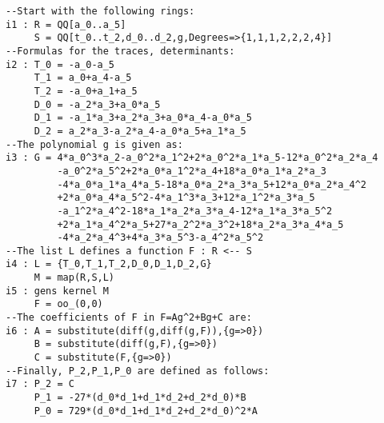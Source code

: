 %
\begin{small} 
\begin{verbatim}
--Start with the following rings:
i1 : R = QQ[a_0..a_5]
     S = QQ[t_0..t_2,d_0..d_2,g,Degrees=>{1,1,1,2,2,2,4}]
--Formulas for the traces, determinants:
i2 : T_0 = -a_0-a_5
     T_1 = a_0+a_4-a_5
     T_2 = -a_0+a_1+a_5
     D_0 = -a_2*a_3+a_0*a_5
     D_1 = -a_1*a_3+a_2*a_3+a_0*a_4-a_0*a_5
     D_2 = a_2*a_3-a_2*a_4-a_0*a_5+a_1*a_5
--The polynomial g is given as:
i3 : G = 4*a_0^3*a_2-a_0^2*a_1^2+2*a_0^2*a_1*a_5-12*a_0^2*a_2*a_4
         -a_0^2*a_5^2+2*a_0*a_1^2*a_4+18*a_0*a_1*a_2*a_3
         -4*a_0*a_1*a_4*a_5-18*a_0*a_2*a_3*a_5+12*a_0*a_2*a_4^2
         +2*a_0*a_4*a_5^2-4*a_1^3*a_3+12*a_1^2*a_3*a_5
         -a_1^2*a_4^2-18*a_1*a_2*a_3*a_4-12*a_1*a_3*a_5^2
         +2*a_1*a_4^2*a_5+27*a_2^2*a_3^2+18*a_2*a_3*a_4*a_5
         -4*a_2*a_4^3+4*a_3*a_5^3-a_4^2*a_5^2  
--The list L defines a function F : R <-- S
i4 : L = {T_0,T_1,T_2,D_0,D_1,D_2,G} 
     M = map(R,S,L)
i5 : gens kernel M
     F = oo_(0,0)
--The coefficients of F in F=Ag^2+Bg+C are:
i6 : A = substitute(diff(g,diff(g,F)),{g=>0})
     B = substitute(diff(g,F),{g=>0})
     C = substitute(F,{g=>0})
--Finally, P_2,P_1,P_0 are defined as follows:
i7 : P_2 = C
     P_1 = -27*(d_0*d_1+d_1*d_2+d_2*d_0)*B
     P_0 = 729*(d_0*d_1+d_1*d_2+d_2*d_0)^2*A
\end{verbatim}
\end{small}